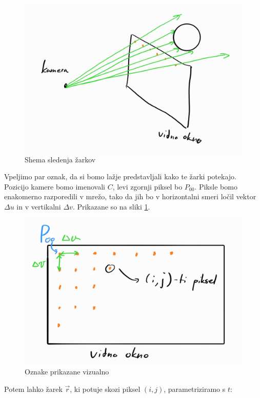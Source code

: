 \documentclass[12pt, a4paper]{article}
\begin{document}
\begin{figure}[H]
	\includegraphics[width=\textwidth]{shema_zarki}
	\caption{Shema sledenja žarkov}
\end{figure}

Vpeljimo par oznak, da si bomo lažje predstavljali kako te žarki potekajo. Pozicijo kamere bomo imenovali $C$,
levi zgornji piksel bo $P_{00}$. Piksle bomo enakomerno razporedili v mrežo, tako da jih bo v horizontalni
smeri ločil vektor $\Delta u$ in v vertikalni $\Delta v$. Prikazane so na sliki \ref{fig:oznake}.

\begin{figure}[h]
	\centering
	\includegraphics[width=\textwidth]{vidno_okno}
	\caption{Oznake prikazane vizualno}
	\label{fig:oznake}
\end{figure}

Potem lahko žarek $\vec{r}$, ki potuje skozi piksel $(i,j)$, parametriziramo s $t$:
\end{document}
